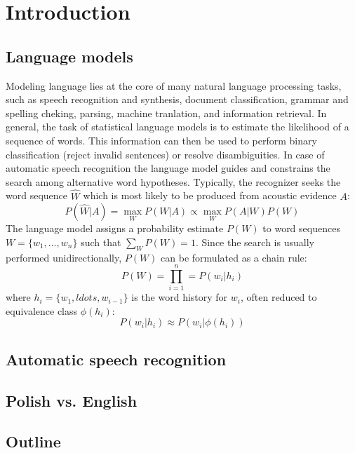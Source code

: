\chapter{Introduction}
\label{chapter:intro}

\section{Language models}
\label{section:lm}
Modeling language lies at the core of many natural language processing tasks, such as speech recognition and synthesis, document classification, grammar and spelling cheking, parsing, machine tranlation, and information retrieval. In general, the task of statistical language models is to estimate the likelihood of a sequence of words. This information can then be used to perform binary classification (reject invalid sentences) or resolve disambiguities. In case of automatic speech recognition the language model guides and constrains the search among alternative word hypotheses. Typically, the recognizer seeks the word sequence $\hat{W}$ which is most likely to be produced from acoustic evidence $A$:
\begin{equation}
  P(\hat W|A)=\max_{W}P(W|A)\propto\max_{W}P(A|W)P(W)
\end{equation}
The language model assigns a probability estimate $P(W)$ to word sequences $W=\{w_{1}, \ldots, w_{n}\}$ such that $\sum_{W}P(W)=1$. Since the search is usually performed unidirectionally, $P(W)$ can be formulated as a chain rule:
\begin{equation}
  P(W)=\prod^{n}_{i=1}=P(w_{i}|h_{i})
\end{equation}
where $h_{i}=\{w_{1}, ldots, w_{i-1}\}$ is the word history for $w_{i}$, often reduced to equivalence class $\phi(h_{i})$:
\begin{equation}
  P(w_{i}|h_{i})\approx P(w_{i}|\phi(h_{i}))
\end{equation}

\cite{rosenfeld2000two}

\section{Automatic speech recognition}
\label{section:asr}

\section{Polish vs. English}
\label{section:polish}

\section{Outline}
\label{section:outline}


















